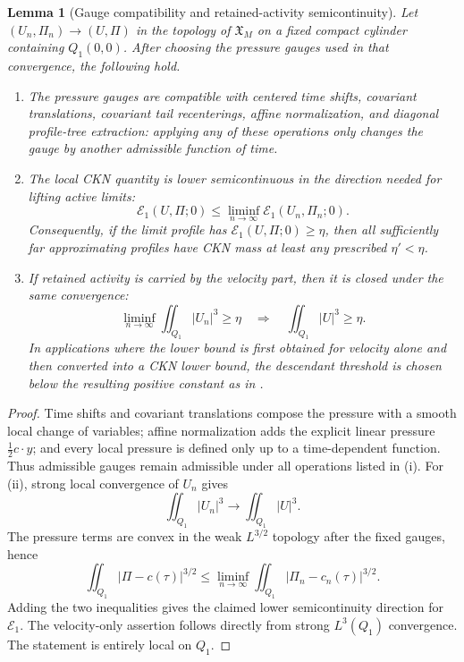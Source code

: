 \documentclass[11pt]{amsart}
\numberwithin{equation}{section}
\theoremstyle{plain}
\newtheorem{lemma}[theorem]{Lemma}
\theoremstyle{definition}
\theoremstyle{remark}
\newcommand{\calE}{\mathcal E}
\begin{document}
\begin{lemma}[Gauge compatibility and retained-activity semicontinuity]
\label{lem:gauge-compatibility}
Let \((U_n,\Pi_n)\to(U,\Pi)\) in the topology of
\(\mathfrak X_M\) on a fixed compact cylinder containing \(Q_1(0,0)\).  After
choosing the pressure gauges used in that convergence, the following hold.
\begin{enumerate}[label=\textup{(\roman*)}]
   \item The pressure gauges are compatible with centered time shifts,
   covariant translations, covariant tail recenterings, affine normalization,
   and diagonal profile-tree extraction: applying any of these operations only
   changes the gauge by another admissible function of time.
   \item The local CKN quantity is lower semicontinuous in the direction needed
   for lifting active limits:
   \[
      \calE_1(U,\Pi;0)
      \le
      \liminf_{n\to\infty}\calE_1(U_n,\Pi_n;0).
   \]
   Consequently, if the limit profile has
   \(\calE_1(U,\Pi;0)\ge\eta\), then all sufficiently far approximating
   profiles have CKN mass at least any prescribed \(\eta'<\eta\).
   \item If retained activity is carried by the velocity part, then it is
   closed under the same convergence:
   \[
      \liminf_{n\to\infty}\iint_{Q_1}|U_n|^3\ge\eta
      \quad\Longrightarrow\quad
      \iint_{Q_1}|U|^3\ge\eta .
   \]
   In applications where the lower bound is first obtained for velocity alone
   and then converted into a CKN lower bound, the descendant threshold is chosen
   below the resulting positive constant as in
   .
\end{enumerate}
\end{lemma}

\begin{proof}
Time shifts and covariant translations compose the pressure with a smooth local
change of variables; affine normalization adds the explicit linear pressure
\(\frac12c\cdot y\); and every local pressure is defined only up to a
time-dependent function.  Thus admissible gauges remain admissible under all
operations listed in (i).  For (ii), strong local convergence of \(U_n\) gives
\[
   \iint_{Q_1}|U_n|^3\to\iint_{Q_1}|U|^3 .
   \]
The pressure terms are convex in the weak \(L^{3/2}\) topology after the fixed
gauges, hence
\[
   \iint_{Q_1}|\Pi-c(\tau)|^{3/2}
   \le
   \liminf_{n\to\infty}
   \iint_{Q_1}|\Pi_n-c_n(\tau)|^{3/2}.
   \]
Adding the two inequalities gives the claimed lower semicontinuity direction
for \(\calE_1\).  The velocity-only assertion follows directly from strong
\(L^3(Q_1)\) convergence.  The statement is entirely local on \(Q_1\).
\end{proof}
\end{document}
